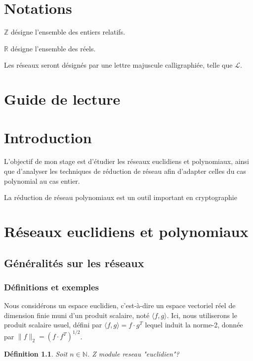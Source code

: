 \documentclass[a4paper,12pt]{report}  %
\theoremstyle{definitionstyle}
\newtheorem{definition}{Définition}[chapter] %
\theoremstyle{examplestyle}
\theoremstyle{remarkstyle}
\begin{document}
	\chapter*{Notations}
	
	$\mathbb{Z}$ désigne l'ensemble des entiers relatifs.
	
	$\mathbb{R}$ désigne l'ensemble des réels.	
	
	Les réseaux seront désignés par une lettre majuscule calligraphiée, telle que $\mathcal{L}$.
	
	\chapter*{Guide de lecture}

	
	
	
	
	
	
	\chapter*{Introduction}
	
	L'objectif de mon stage est d'étudier les réseaux euclidiens et polynomiaux, ainsi que d'analyser les techniques de réduction de réseau afin d'adapter celles du cas polynomial au cas entier.
	
	La réduction de réseau polynomiaux est un outil important en cryptographie 
	
	\chapter{Réseaux euclidiens et polynomiaux}
	
	\section{Généralités sur les réseaux}
	\subsection{Définitions et exemples}
	Nous considérons un espace euclidien, c'est-à-dire un espace vectoriel réel de dimension finie muni d'un produit scalaire, noté $\langle f, g \rangle$. Ici, nous utiliserons le produit scalaire usuel, défini par $\langle f, g \rangle = f \cdot g^T$ lequel induit la norme-2, donnée par $\|f\|_2=(f \cdot f^T)^{1/2}$.
	
	\begin{definition}%
		Soit $n \in \mathbb{N}$. Z module reseau "euclidien"?
	\end{definition}
\end{document}
